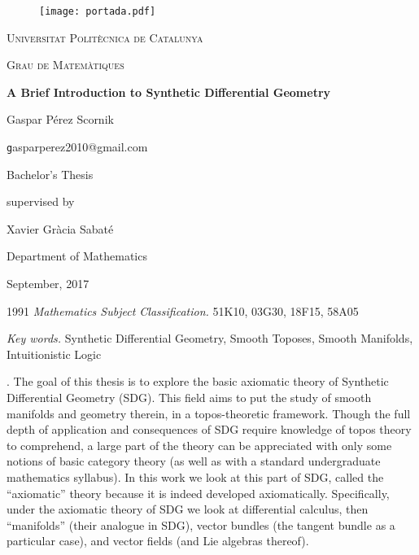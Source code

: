 \documentclass[12pt]{amsbook}
\begin{document}
\begin{figure}
  \begin{center}
   \texttt{[image: portada.pdf]}
  \end{center}
\end{figure}

\begin{titlepage}
	\centering
	{\scshape\LARGE Universitat Polit\`ecnica de Catalunya\par}
	\vspace{1cm}
	{\scshape\Large Grau de Matem\`atiques\par}
	\vspace{1.5cm}
	{\huge\bfseries A Brief Introduction to Synthetic Differential Geometry\par}
	\vspace{2cm}
	{\Large Gaspar P\'erez Scornik\par}
	\vspace{0.3cm}
	{\texttt gasparperez2010@gmail.com\par}
	\vfill
	Bachelor's Thesis\par
	supervised by\par
	\vspace{0.3cm}
	Xavier Gr\`acia Sabat\'e\par
  Department of Mathematics

	\vfill

	{\large September, 2017}
\end{titlepage}

\frontmatter

\setcounter{page}{2}

\begin{center}
  1991 {\itshape Mathematics Subject Classification.} 51K10, 03G30, 18F15, 58A05\par
  \vspace{0.3cm}
  {\itshape Key words.} Synthetic Differential Geometry, Smooth Toposes, Smooth Manifolds, Intuitionistic Logic\par
\end{center}

\vspace{0.5cm}

. The goal of this thesis is to explore the basic axiomatic theory of Synthetic Differential Geometry (SDG). This field aims to put the study of smooth manifolds and geometry therein, in
a topos-theoretic framework. Though the full depth of application and consequences of SDG
require knowledge of topos theory to comprehend, a large part of the theory can be appreciated
with only some notions of basic category theory (as well as with a standard undergraduate
mathematics syllabus). In this work we look at this part of SDG, called the “axiomatic” theory
because it is indeed developed axiomatically. Specifically, under the axiomatic theory of SDG
we look at differential calculus, then “manifolds” (their analogue in SDG), vector bundles (the
tangent bundle as a particular case), and vector fields (and Lie algebras thereof).\par
\vspace{0.2cm}
\end{document}
